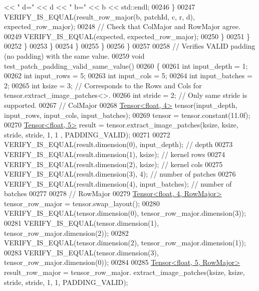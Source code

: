 \begin{DoxyCode}
       << \textcolor{stringliteral}{" d="} << d << \textcolor{stringliteral}{" b="} << b << std::endl;
00246               \}
00247               VERIFY\_IS\_EQUAL(result\_row\_major(b, patchId, c, r, d), expected\_row\_major);
00248               \textcolor{comment}{// Check that ColMajor and RowMajor agree.}
00249               VERIFY\_IS\_EQUAL(expected, expected\_row\_major);
00250             \}
00251           \}
00252         \}
00253       \}
00254     \}
00255   \}
00256 \}
00257 
00258 \textcolor{comment}{// Verifies VALID padding (no padding) with the same value.}
00259 \textcolor{keywordtype}{void} test\_patch\_padding\_valid\_same\_value()
00260 \{
00261   \textcolor{keywordtype}{int} input\_depth = 1;
00262   \textcolor{keywordtype}{int} input\_rows = 5;
00263   \textcolor{keywordtype}{int} input\_cols = 5;
00264   \textcolor{keywordtype}{int} input\_batches = 2;
00265   \textcolor{keywordtype}{int} ksize = 3;  \textcolor{comment}{// Corresponds to the Rows and Cols for tensor.extract\_image\_patches<>.}
00266   \textcolor{keywordtype}{int} stride = 2;  \textcolor{comment}{// Only same stride is supported.}
00267   \textcolor{comment}{// ColMajor}
00268   \hyperlink{class_eigen_1_1_tensor}{Tensor<float, 4>} tensor(input\_depth, input\_rows, input\_cols, input\_batches);
00269   tensor = tensor.constant(11.0f);
00270   \hyperlink{class_eigen_1_1_tensor}{Tensor<float, 5>} result = tensor.extract\_image\_patches(ksize, ksize, stride, stride, 1, 1
      , PADDING\_VALID);
00271 
00272   VERIFY\_IS\_EQUAL(result.dimension(0), input\_depth);  \textcolor{comment}{// depth}
00273   VERIFY\_IS\_EQUAL(result.dimension(1), ksize);  \textcolor{comment}{// kernel rows}
00274   VERIFY\_IS\_EQUAL(result.dimension(2), ksize);  \textcolor{comment}{// kernel cols}
00275   VERIFY\_IS\_EQUAL(result.dimension(3), 4);  \textcolor{comment}{// number of patches}
00276   VERIFY\_IS\_EQUAL(result.dimension(4), input\_batches);  \textcolor{comment}{// number of batches}
00277 
00278   \textcolor{comment}{// RowMajor}
00279   \hyperlink{class_eigen_1_1_tensor}{Tensor<float, 4, RowMajor>} tensor\_row\_major = tensor.swap\_layout();
00280   VERIFY\_IS\_EQUAL(tensor.dimension(0), tensor\_row\_major.dimension(3));
00281   VERIFY\_IS\_EQUAL(tensor.dimension(1), tensor\_row\_major.dimension(2));
00282   VERIFY\_IS\_EQUAL(tensor.dimension(2), tensor\_row\_major.dimension(1));
00283   VERIFY\_IS\_EQUAL(tensor.dimension(3), tensor\_row\_major.dimension(0));
00284 
00285   \hyperlink{class_eigen_1_1_tensor}{Tensor<float, 5, RowMajor>} result\_row\_major = tensor\_row\_major.
      extract\_image\_patches(ksize, ksize, stride, stride, 1, 1, PADDING\_VALID);

\end{DoxyCode}
